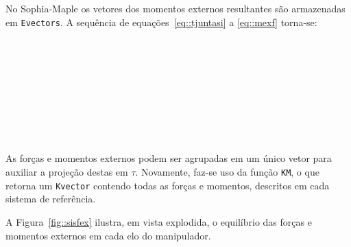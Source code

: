 
No Sophia-Maple os vetores dos momentos externos resultantes são armazenadas em
\texttt{Evectors}. A sequência de equações~\ref{eq::tjuntasi} a \ref{eq::mexf}
torna-se:

\bigskip {} \\
		  \\
		  \\
		  \\
		  \\

\medskip {} \\
		  \\
		  \bigskip

		 
As forças e momentos externos podem ser agrupadas em um único vetor para
auxiliar a projeção destas em $\tau$. Novamente, faz-se uso da função
\texttt{KM}, o que retorna um \texttt{Kvector} contendo todas as forças e
momentos, descritos em cada sistema de referência.

\bigskip {} \bigskip

A Figura~\ref{fig::sisfex} ilustra, em vista explodida, o equilíbrio das forças e
momentos externos em cada elo do manipulador.

